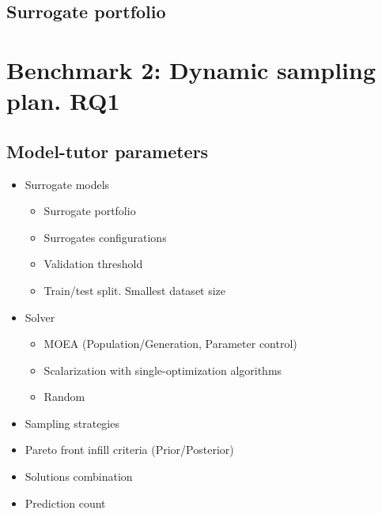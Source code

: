    \subsection{Surrogate portfolio}



\section{Benchmark 2: Dynamic sampling plan. RQ1}
    \subsection{Model-tutor parameters}
    \begin{itemize}
        \item Surrogate models
            \begin{itemize}
                \item Surrogate portfolio
                \item Surrogates configurations
                \item Validation threshold
                \item Train/test split. Smallest dataset size
            \end{itemize}
        \item Solver
            \begin{itemize}
                \item MOEA (Population/Generation, Parameter control)
                \item Scalarization with single-optimization algorithms
                \item Random 
            \end{itemize}
        \item Sampling strategies
        \item Pareto front infill criteria (Prior/Posterior)
        \item Solutions combination
        \item Prediction count
    \end{itemize}



